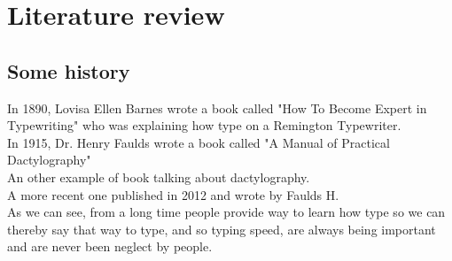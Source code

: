 \documentclass[12pt]{report}%
\begin{document}
\clearpage
\chapter{Literature review}
\section{Some history}
In 1890, Lovisa Ellen Barnes wrote a book called "How To Become Expert in Typewriting"\cite{ref2} who was explaining how type on a Remington Typewriter.\\
In 1915, Dr. Henry Faulds wrote a book called "A Manual of Practical Dactylography"\cite{ref3}\\
An other example of book talking about dactylography.\cite{ref5}\\   
A more recent one published in 2012 and wrote by Faulds H.\cite{ref4}\\
As we can see, from a long time people provide way to learn how type so we can thereby say that way to type, and so typing speed, are always being important and are never been neglect by people.\\
\end{document}
